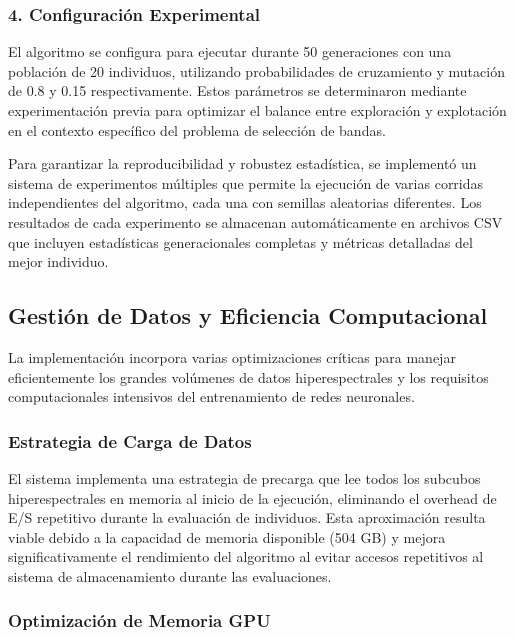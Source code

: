 \subsubsection{4. Configuración Experimental}

El algoritmo se configura para ejecutar durante 50 generaciones con una población de 20 individuos, utilizando probabilidades de cruzamiento y mutación de 0.8 y 0.15 respectivamente. Estos parámetros se determinaron mediante experimentación previa para optimizar el balance entre exploración y explotación en el contexto específico del problema de selección de bandas.

\vspace{5mm}

Para garantizar la reproducibilidad y robustez estadística, se implementó un sistema de experimentos múltiples que permite la ejecución de varias corridas independientes del algoritmo, cada una con semillas aleatorias diferentes. Los resultados de cada experimento se almacenan automáticamente en archivos CSV que incluyen estadísticas generacionales completas y métricas detalladas del mejor individuo.

\subsection{Gestión de Datos y Eficiencia Computacional}

La implementación incorpora varias optimizaciones críticas para manejar eficientemente los grandes volúmenes de datos hiperespectrales y los requisitos computacionales intensivos del entrenamiento de redes neuronales.

\subsubsection{Estrategia de Carga de Datos}

El sistema implementa una estrategia de precarga que lee todos los subcubos hiperespectrales en memoria al inicio de la ejecución, eliminando el overhead de E/S repetitivo durante la evaluación de individuos. Esta aproximación resulta viable debido a la capacidad de memoria disponible (504 GB) y mejora significativamente el rendimiento del algoritmo al evitar accesos repetitivos al sistema de almacenamiento durante las evaluaciones.

\subsubsection{Optimización de Memoria GPU}

